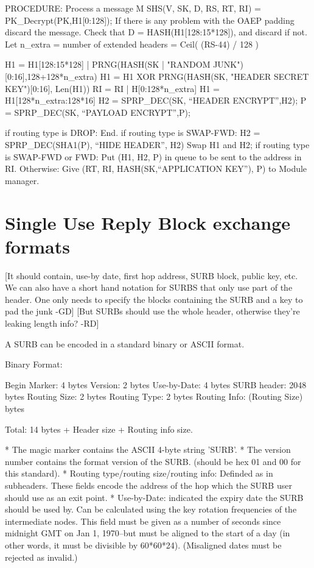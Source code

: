 PROCEDURE: Process a message M
	SHS(V, SK, D, RS, RT, RI) = PK_Decrypt(PK,H1[0:128]);
        If there is any problem with the OAEP padding discard the message.
        Check that D = HASH(H1[128:15*128]), and discard if not.
        Let n_extra = number of extended headers = Ceil( (RS-44) / 128 )
                  
        H1 = H1[128:15*128] | PRNG(HASH(SK | "RANDOM 
                                               JUNK")[0:16],128+128*n_extra)
	H1 = H1 XOR PRNG(HASH(SK, "HEADER SECRET KEY")[0:16], Len(H1))
        RI = RI | H[0:128*n_extra]
        H1 = H1[128*n_extra:128*16]
	H2 = SPRP_DEC(SK, ``HEADER ENCRYPT'',H2);
	P = SPRP_DEC(SK, ``PAYLOAD ENCRYPT'',P);

	if routing type is DROP:
                End.
	if routing type is SWAP-FWD:
		H2 = SPRP_DEC(SHA1(P), ``HIDE HEADER'', H2)
		Swap H1 and H2;
        if routing type is SWAP-FWD or FWD:
	   	Put (H1, H2, P) in queue to be sent to the address in RI.
        Otherwise:
		Give (RT, RI, HASH(SK,``APPLICATION KEY''), P) to
Module manager. 

\section{Single Use Reply Block exchange formats}

[It should contain, use-by date, first hop address, 
 SURB block, public key, etc.
 We can also have a short hand notation for SURBS that only
 use part of the header. One only needs to specify the 
 blocks containing the SURB and a key to pad the junk -GD]
 [But SURBs should use the whole header, otherwise they're
  leaking length info? -RD]


A SURB can be encoded in a standard binary or ASCII format.

Binary Format:

   Begin Marker: 4 bytes
   Version:      2 bytes
   Use-by-Date:  4 bytes
   SURB header:  2048 bytes
   Routing Size: 2 bytes
   Routing Type: 2 bytes
   Routing Info: (Routing Size) bytes

   Total: 14 bytes + Header size + Routing info size.

* The magic marker contains the ASCII 4-byte string 'SURB'. 
* The version number contains the format version of the SURB.
  (should be hex 01 and 00 for this standard).
* Routing type/routing size/routing info: Definded as in subheaders.  
  These fields encode the address of the hop which the SURB user should
  use as an exit point.
* Use-by-Date: indicated the expiry date the SURB should be used by. Can
  be calculated using the key rotation frequencies of the intermediate
  nodes.  This field must be given as a number of seconds since
  midnight GMT on Jan 1, 1970--but must be aligned to the start of a
  day (in other words, it must be divisible by 60*60*24).
  (Misaligned dates must be rejected as invalid.)

